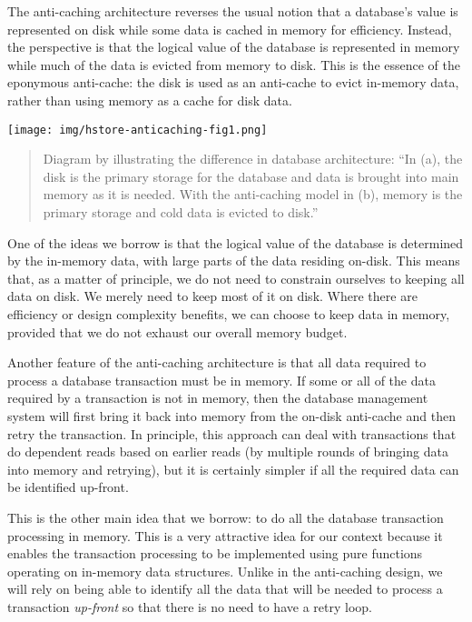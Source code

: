 \documentclass[11pt,a4paper]{article}
\begin{document}
The anti-caching architecture reverses the usual notion that a database's value
is represented on disk while some data is cached in memory for efficiency.
Instead, the perspective is that the logical value of the database is
represented in memory while much of the data is evicted from memory to disk.
This is the essence of the eponymous anti-cache: the disk is used as an
anti-cache to evict in-memory data, rather than using memory as a cache for disk
data.

\begin{center}
\texttt{[image: img/hstore-anticaching-fig1.png]}
\begin{quote}
Diagram by \citet[Figure 1]{anti-caching} illustrating the difference in
database architecture: ``In (a), the disk is the primary storage for the
database and data is brought into main memory as it is needed. With the
anti-caching model in (b), memory is the primary storage and cold data is
evicted to disk.''
\end{quote}
\end{center}

One of the ideas we borrow is that the logical value of the database is
determined by the in-memory data, with large parts of the data residing on-disk.
This means that, as a matter of principle, we do not need to constrain ourselves
to keeping all data on disk. We merely need to keep most of it on disk. Where
there are efficiency or design complexity benefits, we can choose to keep data
in memory, provided that we do not exhaust our overall memory budget.

Another feature of the anti-caching architecture is that all data required to
process a database transaction must be in memory. If some or all of the data
required by a transaction is not in memory, then the database management system
will first bring it back into memory from the on-disk anti-cache and then retry
the transaction. In principle, this approach can deal with transactions that do
dependent reads based on earlier reads (by multiple rounds of bringing data into
memory and retrying), but it is certainly simpler if all the required data can
be identified up-front.

This is the other main idea that we borrow: to do all the database transaction
processing in memory. This is a very attractive idea for our context because it
enables the transaction processing to be implemented using pure functions
operating on in-memory data structures. Unlike in the anti-caching design, we
will rely on being able to identify all the data that will be
needed to process a transaction \emph{up-front} so that there is no need to have a retry loop.
\end{document}
